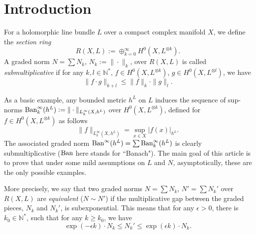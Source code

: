 \documentclass[12pt]{article}
\numberwithin{equation}{section}
\theoremstyle{theorem}
\theoremstyle{definition}
\theoremstyle{remark}
\newcommand{\nat}{\mathbb{N}}
\begin{document}
\tableofcontents

\vspace*{-0.2cm}

\noindent \hrulefill



\section{Introduction}\label{sect_intro}
	For a holomorphic line bundle $L$ over a compact complex manifold $X$, we define the \textit{section ring}
	\begin{equation}
		R(X, L) := \oplus_{k = 0}^{\infty} H^0(X, L^{\otimes k}).
	\end{equation}
	A graded norm $N = \sum N_k$, $N_k := \| \cdot \|_k$, over $R(X, L)$ is called \textit{submultiplicative} if for any $k, l \in \nat^*$, $f \in H^0(X, L^{\otimes k})$, $g \in H^0(X, L^{\otimes l})$, we have
	\begin{equation}\label{eq_subm_s_ring}
		\| f \cdot g \|_{k + l} \leq 
		\| f \|_k \cdot
		\| g \|_l.
	\end{equation}
	\par 
	\begin{sloppypar}
	As a basic example, any bounded metric $h^L$ on $L$ induces the sequence of sup-norms ${\rm{Ban}}^{\infty}_k(h^L) := \| \cdot \|_{L^{\infty}_{k}(X, h^L)}$ over $H^0(X, L^{\otimes k})$, defined for $f \in H^0(X, L^{\otimes k})$ as follows
	\begin{equation}
		\| f \|_{L^{\infty}_{k}(X, h^L)} = \sup_{x \in X} |f(x)|_{h^L}.
	\end{equation}
	The associated graded norm ${\rm{Ban}}^{\infty}(h^L) = \sum {\rm{Ban}}^{\infty}_k(h^L)$ is clearly submultiplicative (${\rm{Ban}}$ here stands for “Banach").
	The main goal of this article is to prove that under some mild assumptions on $L$ and $N$, asymptotically, these are the only possible examples.
	\end{sloppypar}
	\par 
	More precisely, we say that two graded norms $N = \sum N_k$, $N' = \sum N_k'$ over $R(X, L)$ are \textit{equivalent} ($N \sim N'$) if the multiplicative gap between the graded pieces, $N_k$ and $N_k'$, is subexponential. This means that for any $\epsilon > 0$, there is $k_0 \in \nat^*$, such that for any $k \geq k_0$, we have
	\begin{equation}\label{defn_equiv_rel}
		\exp(-\epsilon k) \cdot N_k
		\leq
		N_k'
		\leq
		\exp(\epsilon k) \cdot N_k.
	\end{equation}
\end{document}

